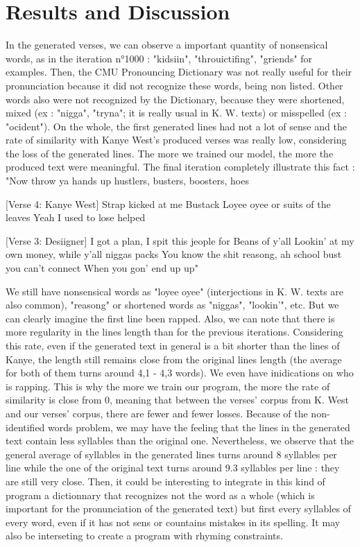 \documentclass[12pt,a4paper]{article}
\begin{document}
\section{Results and Discussion}

In the generated verses, we can observe a important quantity of nonsensical words, as in the iteration n°1000 : "kidsiin", "throuictifing", "griends" for examples. Then, the CMU Pronouncing Dictionary was not really useful for their pronunciation because it did not recognize these words, being non listed. Other words also were not recognized by the Dictionary, because they were shortened, mixed (ex : "nigga", "tryna"; it is really usual in K. W. texts) or misspelled (ex : "ocident"). On the whole, the first generated lines had not a lot of sense and the rate of similarity with Kanye West's produced verses was really low, considering the loss of the generated lines. The more we trained our model, the more the produced text were meaningful. The final iteration completely illustrate this fact : 
"Now throw ya hands up hustlers, busters, boosters, hoes

[Verse 4: Kanye West]
Strap kicked at me Bustack
Loyee oyee or suits of the leaves
Yeah I used to lose helped

[Verse 3: Desiigner]
I got a plan, I spit this jeople for Beans of y'all
Lookin' at my own money, while y'all niggas packs
You know the shit reasong, ah school bust you can't connect
When you gon' end up up"

We still have nonsensical words as "loyee oyee" (interjections in K. W. texts are also common), "reasong" or shortened words as "niggas", "lookin'", etc. But we can clearly imagine the first line been rapped. Also, we can note that there is more regularity in the lines length than for the previous iterations. Considering this rate, even if the generated text in general is a bit shorter than the lines of Kanye, the length still remains close from the original lines length (the average for both of them turns around 4,1 - 4,3 words). We even have inidications on who is rapping. This is why the more we train our program, the more the rate of similarity is close from 0, meaning that between the verses' corpus from K. West and our verses' corpus, there are fewer and fewer losses. Because of the non-identified words problem, we may have the feeling that the lines in the generated text contain less syllables than the original one. Nevertheless, we observe that the general average of syllables in the generated lines turns around 8 syllables per line while the one of the original text turns around 9.3 syllables per line : they are still very close. Then, it could be interesting to integrate in this kind of program a dictionnary that recognizes not the word as a whole (which is important for the pronunciation of the generated text) but first every syllables of every word, even if it has not sens or countains mistakes in its spelling. It may also be interseting to create a program with rhyming constraints.



\end{document}
